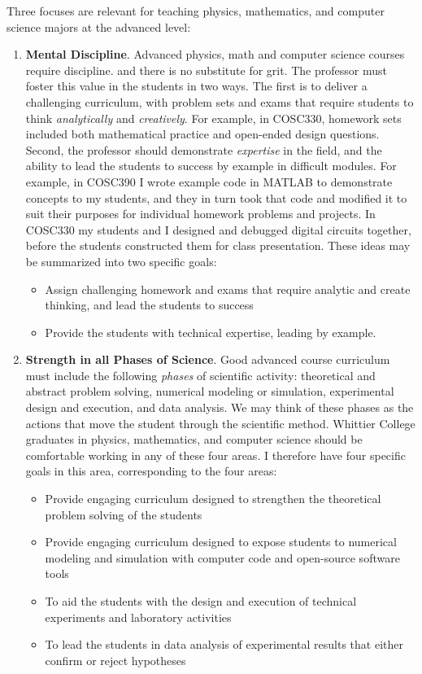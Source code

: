 \documentclass[../../main.tex]{subfiles}
\begin{document}
Three focuses are relevant for teaching physics, mathematics, and computer science majors at the advanced level:
\begin{enumerate}
\item \textbf{Mental Discipline}.  Advanced physics, math and computer science courses require discipline. and there is no substitute for grit.  The professor must foster this value in the students in two ways.  The first is to deliver a challenging curriculum, with problem sets and exams that require students to think \textit{analytically} and \textit{creatively}.  For example, in COSC330, homework sets included both mathematical practice and open-ended design questions.  Second, the professor should demonstrate \textit{expertise} in the field, and the ability to lead the students to success by example in difficult modules.  For example, in COSC390 I wrote example code in MATLAB to demonstrate concepts to my students, and they in turn took that code and modified it to suit their purposes for individual homework problems and projects.  In COSC330 my students and I designed and debugged digital circuits together, before the students constructed them for class presentation.  These ideas may be summarized into two specific goals:

\begin{itemize}
\item Assign challenging homework and exams that require analytic and create thinking, and lead the students to success %
\item Provide the students with technical expertise, leading by example. %
\end{itemize}

\item \textbf{Strength in all Phases of Science}. Good advanced course curriculum must include the following \textit{phases} of scientific activity: theoretical and abstract problem solving, numerical modeling or simulation, experimental design and execution, and data analysis.  We may think of these phases as the actions that move the student through the scientific method.  Whittier College graduates in physics, mathematics, and computer science should be comfortable working in any of these four areas.  I therefore have four specific goals in this area, corresponding to the four areas:

\begin{itemize}
\item Provide engaging curriculum designed to strengthen the theoretical problem solving of the students
\item Provide engaging curriculum designed to expose students to numerical modeling and simulation with computer code and open-source software tools
\item To aid the students with the design and execution of technical experiments and laboratory activities
\item To lead the students in data analysis of experimental results that either confirm or reject hypotheses
\end{itemize}


\end{enumerate}
\end{document}
